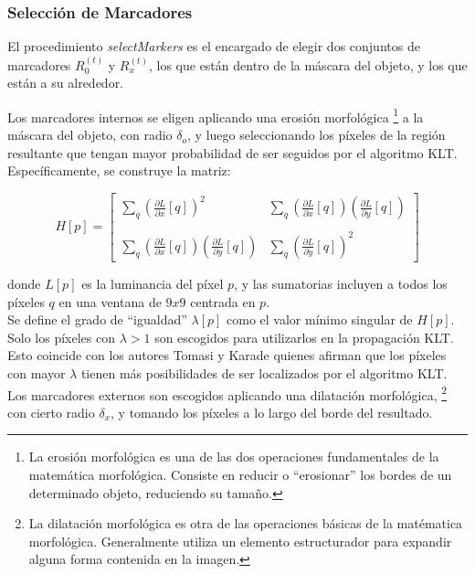 \documentclass[a4paper,10pt]{article}
\begin{document}
\subsubsection{Selección de Marcadores}
El procedimiento \textit{selectMarkers} es el encargado de elegir dos conjuntos
de marcadores $R_{0}^{(t)}$ y $R_{x}^{(t)}$, los que están dentro de la máscara del objeto, y los que están a
su alrededor.

Los marcadores internos se eligen aplicando una erosión morfológica
\footnote{La erosión morfológica es una de las dos operaciones fundamentales de la matemática morfológica. Consiste
en reducir o ``erosionar'' los bordes de un determinado objeto, reduciendo su tamaño. }
 a la máscara del objeto, con radio $\delta_{o}$, y
luego seleccionando los píxeles de la región resultante que tengan mayor probabilidad
de ser seguidos por el algoritmo KLT. Específicamente, se construye la matriz:

\begin{equation}
    H[p] = \left[\begin{array}{cc}
                \sum_{q}(\frac{\partial L}{\partial x}[q])^2 & \sum_{q}(\frac{\partial L}{\partial x}[q])(\frac{\partial L}{\partial y}[q]) \\
                & \\
                \sum_{q}(\frac{\partial L}{\partial x}[q])(\frac{\partial L}{\partial y}[q]) & \sum_{q}(\frac{\partial L}{\partial y}[q])^2 \end{array}\right]
    \label{IFTrace-matrix-H}
\end{equation}


donde $L[p]$ es la luminancia del píxel $p$, y las sumatorias incluyen a todos los
píxeles $q$ en una ventana de $9x9$ centrada en $p$.\\
Se define el grado de ``igualdad'' $\lambda[p]$ como el valor mínimo singular de $H[p]$.
Solo los píxeles con $\lambda > 1$ son escogidos para utilizarlos en la
propagación KLT. Esto coincide con los autores Tomasi y Karade \cite{Tomasi91detectionand}
quienes afirman que los píxeles con mayor $\lambda$ tienen más posibilidades
de ser localizados por el algoritmo KLT.\\
Los marcadores externos son escogidos aplicando una dilatación morfológica,
\footnote{La dilatación morfológica es otra de las operaciones  básicas de la matématica morfológica. Generalmente utiliza un elemento
estructurador para expandir alguna forma contenida en la imagen.}
 con cierto radio $\delta_{x}$, y tomando los píxeles a lo largo del borde del resultado.
\end{document}
